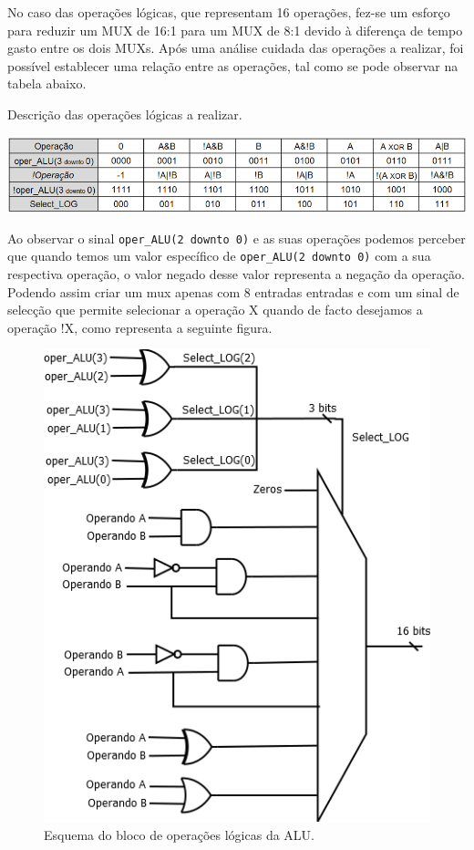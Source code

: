 \documentclass[11pt]{article}
\numberwithin{equation}{section}
\begin{document}
No caso das operações lógicas, que representam 16 operações, fez-se um esforço para reduzir um MUX de 16:1 para um MUX de 8:1 devido à diferença de tempo gasto entre os dois MUXs. Após uma análise cuidada das operações a realizar, foi possível establecer uma relação entre as operações, tal como se pode observar na tabela abaixo.

\begin{table}[h]
	\centering
	\caption{Descrição das operações lógicas a realizar.}
	\vspace{-2mm}
 	\includegraphics[keepaspectratio=true, scale=0.35]{tabelas/MUX8-1}
\end{table}

Ao observar o sinal \texttt{oper\_ALU(2 {\footnotesize downto} 0)} e as suas operações podemos perceber que quando temos um valor específico de \texttt{oper\_ALU(2 {\footnotesize downto} 0)} com a sua respectiva operação, o valor negado desse valor representa a negação da operação. Podendo assim criar um mux apenas com 8 entradas entradas e com um sinal de selecção que permite selecionar a operação X quando de facto desejamos a operação !X, como representa a seguinte figura.

\vspace{1mm}

\begin{figure}[H]
	\centering
	\includegraphics[keepaspectratio=true, scale=0.40]{imagens/Log}
	\caption{Esquema do bloco de operações lógicas da ALU.}
	\vspace{-0.8em}
\end{figure}
\end{document}
